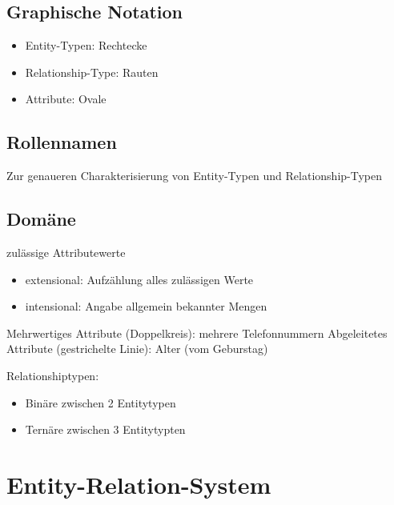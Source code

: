 \documentclass{bschlangaul-theorie}
\begin{document}
\subsection{Graphische Notation}

\begin{itemize}
\item Entity-Typen: Rechtecke
\item Relationship-Type: Rauten
\item Attribute: Ovale
\end{itemize}

\subsection{Rollennamen}

Zur genaueren Charakterisierung von Entity-Typen und Relationship-Typen

\subsection{Domäne}

zulässige Attributewerte

\begin{itemize}
\item extensional: Aufzählung alles zulässigen Werte
\item intensional: Angabe allgemein bekannter Mengen
\end{itemize}

Mehrwertiges Attribute (Doppelkreis): mehrere Telefonnummern
Abgeleitetes Attribute (gestrichelte Linie): Alter (vom Geburstag)

Relationshiptypen:

\begin{itemize}
\item Binäre zwischen 2 Entitytypen
\item Ternäre zwischen 3 Entitytypten
\end{itemize}

\section{Entity-Relation-System}
\end{document}

